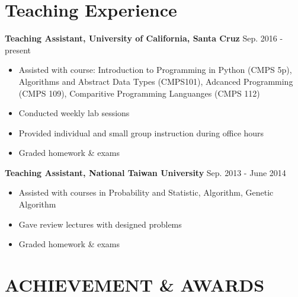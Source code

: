 \documentclass[a4paper,10pt]{article}
\begin{document}
%
%
%



\section{Teaching Experience}
\textbf{Teaching Assistant, University of California, Santa Cruz}  \hfill Sep. 2016 - present
    \begin{itemize}
        \item Assisted with course: Introduction to Programming in Python (CMPS 5p), Algorithms and Abstract Data Types (CMPS101), Adcanced Programming (CMPS 109), Comparitive Programming Languanges (CMPS 112)
        \item Conducted weekly lab sessions
        \item Provided individual and small group instruction during office hours
        \item Graded homework \& exams
    \end{itemize}
\textbf{Teaching Assistant, National Taiwan University} \hfill Sep. 2013 - June 2014
    \begin{itemize}
        \item Assisted with courses in Probability and Statistic, Algorithm, Genetic Algorithm
        \item Gave review lectures with designed problems
        \item Graded homework \& exams
    \end{itemize}

\section{ACHIEVEMENT \& AWARDS}
\end{document}
